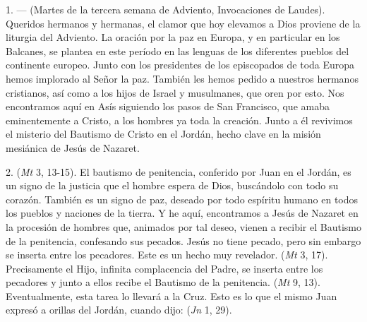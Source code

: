 				\begin{body}
					1.  ---  (Martes de la tercera semana de Adviento, Invocaciones de Laudes). Queridos hermanos y hermanas, el clamor que hoy elevamos a Dios proviene de la liturgia del Adviento. La oración por la paz en Europa, y en particular en los Balcanes, se plantea en este período en las lenguas de los diferentes pueblos del continente europeo. Junto con los presidentes de los episcopados de toda Europa hemos implorado al Señor la paz. También les hemos pedido a nuestros hermanos cristianos, así como a los hijos de Israel y musulmanes, que oren por esto. Nos encontramos aquí en Asís siguiendo los pasos de San Francisco, que amaba eminentemente a Cristo, a los hombres ya toda la creación. Junto a él revivimos el misterio del Bautismo de Cristo en el Jordán, hecho clave en la misión mesiánica de Jesús de Nazaret.
					
					2.  (\emph{Mt} 3, 13-15). El bautismo de penitencia, conferido por Juan en el Jordán, es un signo de la justicia que el hombre espera de Dios, buscándolo con todo su corazón. También es un signo de paz, deseado por todo espíritu humano en todos los pueblos y naciones de la tierra. Y he aquí, encontramos a Jesús de Nazaret en la procesión de hombres que, animados por tal deseo, vienen a recibir el Bautismo de la penitencia, confesando sus pecados. Jesús no tiene pecado, pero sin embargo se inserta entre los pecadores. Este es un hecho muy revelador.  (\emph{Mt} 3, 17). Precisamente el Hijo, infinita complacencia del Padre, se inserta entre los pecadores y junto a ellos recibe el Bautismo de la penitencia.  (\emph{Mt} 9, 13). Eventualmente, esta tarea lo llevará a la Cruz. Esto es lo que el mismo Juan expresó a orillas del Jordán, cuando dijo:  (\emph{Jn} 1, 29).
					

\end{body}
